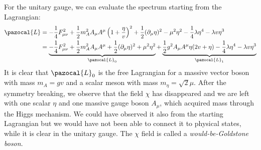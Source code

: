 \documentclass[../main.tex]{subfiles}
\begin{document}
For the unitary gauge, we can evaluate the spectrum starting from the Lagrangian:
\begin{align*}
\pazocal{L}&=-\frac{1}{4}F_{\mu\nu}^2+\frac{1}{2}m_A^2A_\mu A^\mu\left(1+\frac{\eta}{v}\right)^2+\frac{1}{2}(\partial_\mu\eta)^2
-\mu^2\eta^2-\frac{1}{4}\lambda\eta^4-\lambda v\eta^3\\
&=\underbrace{-\frac{1}{4}F_{\mu\nu}^2+\frac{1}{2}m_A^2A_\mu A^\mu+\frac{1}{2}(\partial_\mu\eta)^2+\mu^2\eta^2}_{\pazocal{L}_0}+\underbrace{\frac{1}{2}g^2A_\mu A^\mu\eta(2v+\eta)-\frac{1}{4}\lambda\eta^4-\lambda v\eta^3}_{\pazocal{L}_1}
\end{align*}
It is clear that $\pazocal{L}_0$ is the free Lagrangian for a massive vector boson with mass $m_A=gv$ and a scalar meson with mass $m_\eta=\sqrt{2}\mu$. After the symmetry breaking, we observe that the field $\chi$ has disappeared and we are left with one scalar $\eta$ and one massive gauge boson $A_\mu$, which acquired mass through the Higgs mechanism. We could have observed it also from the starting Lagrangian but we would have not been able to connect it to physical states, while it is clear in the unitary gauge. The $\chi$ field is called a \textit{would-be-Goldstone boson}.
\end{document}
